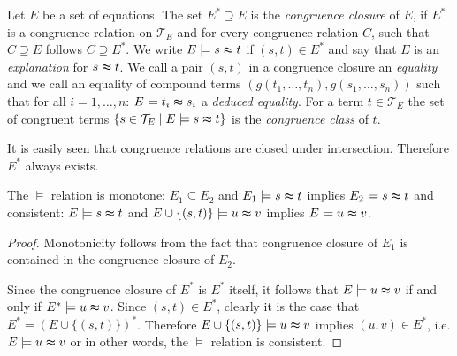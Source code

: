 \begin{definition}

Let $E$ be a set of equations.
The set $E^* \supseteq E$ is the \emph{congruence closure} of $E$, 
if $E^*$ is a congruence relation on $\mathcal{T}_E$ and for every congruence relation $C$, such that $C \supseteq E$ follows $C \supseteq E^*$.
We write $E \models s \thickapprox t$ if $(s,t) \in E^*$ and say that $E$ is an \emph{explanation} for $s \thickapprox t$.
We call a pair $(s,t)$ in a congruence closure an \emph{equality} and we call an equality of compound terms $(g(t_1,\ldots,t_n),g(s_1,\ldots,s_n))$ such that for all $i = 1,\ldots,n$: $E \models t_i \thickapprox s_i$ a \emph{deduced equality}.
For a term $t \in \mathcal{T}_E$ the set of congruent terms $\{s \in \mathcal{T}_E \mid E \models s \thickapprox t\}$ is the \emph{congruence class} of $t$.

\end{definition}

It is easily seen that congruence relations are closed under intersection.
Therefore $E^*$ always exists.

\begin{proposition}
\label{prop:models}
The $\models$ relation is monotone: $E_1 \subseteq E_2$ and $E_1 \models s \thickapprox t$ implies $E_2 \models s \thickapprox t$ and consistent: $E \models s \thickapprox t$ and $E \cup \{(s,t)\} \models u \thickapprox v$ implies $E \models u \thickapprox v$. 

\end{proposition}

\begin{proof}

Monotonicity follows from the fact that congruence closure of $E_1$ is contained in the congruence closure of $E_2$.

Since the congruence closure of $E^*$ is $E^*$ itself, it follows that $E \models u \thickapprox v$ if and only if $E^* \models u \thickapprox v$.
Since $(s,t) \in E^*$, clearly it is the case that $E^* = (E \cup \{(s,t)\})^*$.
Therefore $E \cup \{(s,t)\} \models u \thickapprox v$ implies $(u,v) \in E^*$, i.e. $E \models u \thickapprox v$ or in other words, the $\models$ relation is consistent.

\end{proof}
